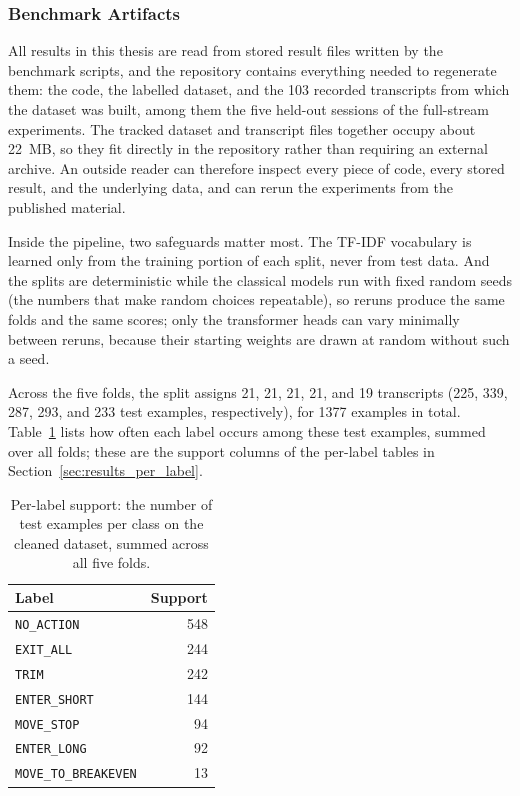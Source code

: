 \subsubsection{Benchmark Artifacts}
\label{sec:reproducibility}

All results in this thesis are read from stored result files written by the benchmark scripts, and the repository contains everything needed to regenerate them: the code, the labelled dataset, and the 103 recorded transcripts from which the dataset was built, among them the five held-out sessions of the full-stream experiments. The tracked dataset and transcript files together occupy about 22~MB, so they fit directly in the repository rather than requiring an external archive. An outside reader can therefore inspect every piece of code, every stored result, and the underlying data, and can rerun the experiments from the published material.

Inside the pipeline, two safeguards matter most. The TF-IDF vocabulary is learned only from the training portion of each split, never from test data. And the splits are deterministic while the classical models run with fixed random seeds (the numbers that make random choices repeatable), so reruns produce the same folds and the same scores; only the transformer heads can vary minimally between reruns, because their starting weights are drawn at random without such a seed.

Across the five folds, the split assigns 21, 21, 21, 21, and 19 transcripts (225, 339, 287, 293, and 233 test examples, respectively), for 1377 examples in total. Table~\ref{tab:support} lists how often each label occurs among these test examples, summed over all folds; these are the support columns of the per-label tables in Section~\ref{sec:results_per_label}.

\begin{table}[H]
\centering
\caption{Per-label support: the number of test examples per class on the cleaned dataset, summed across all five folds.}
\label{tab:support}
\begin{tabular}{@{}lr@{}}
\toprule
\textbf{Label} & \textbf{Support} \\
\midrule
\texttt{NO\_ACTION}          & 548 \\
\texttt{EXIT\_ALL}           & 244 \\
\texttt{TRIM}                & 242 \\
\texttt{ENTER\_SHORT}        & 144 \\
\texttt{MOVE\_STOP}          &  94 \\
\texttt{ENTER\_LONG}         &  92 \\
\texttt{MOVE\_TO\_BREAKEVEN} &  13 \\
\bottomrule
\end{tabular}
\end{table}


